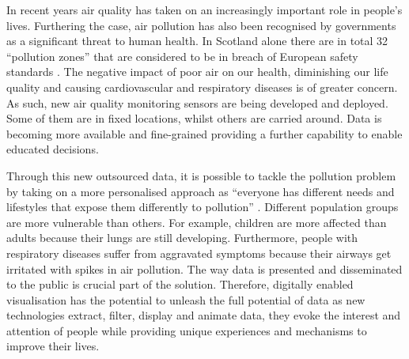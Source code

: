 In recent years air quality has taken on an increasingly important role in people’s lives. Furthering the case, air pollution has also been recognised by governments as a significant threat to human health. In Scotland alone there are in total 32 ``pollution zones'' that are considered to be in breach of European safety standards \cite{Foe-scotland.org.uk} \cite{OKScotland2015}. The negative impact of poor air on our health, diminishing our life quality and causing cardiovascular and respiratory diseases is of greater concern. As such, new air quality monitoring sensors are being developed and deployed. Some of them are in fixed locations, whilst others are carried around. Data is becoming more available and fine-grained providing a further capability to enable educated decisions.

Through this new outsourced data, it is possible to tackle the pollution problem by taking on a  more personalised approach as ``everyone has different needs and lifestyles that expose them differently to pollution'' \cite{Vazquez2016}. Different population groups are more vulnerable than others. For example, children are more affected than adults because their lungs are still developing. Furthermore, people with respiratory diseases suffer from aggravated symptoms because their airways get irritated with spikes in air pollution. The way data is presented and disseminated to the public is crucial part of the solution. Therefore, digitally enabled visualisation has the potential to unleash the full potential of data as new technologies extract, filter, display and animate data, they evoke the interest and attention of people while providing unique experiences and mechanisms to improve their lives.

\iffalse
The effects of air pollution on human health are still complex to understand and there is much research ongoing on the combination short and long term effects upon a person's health. 
\fi
